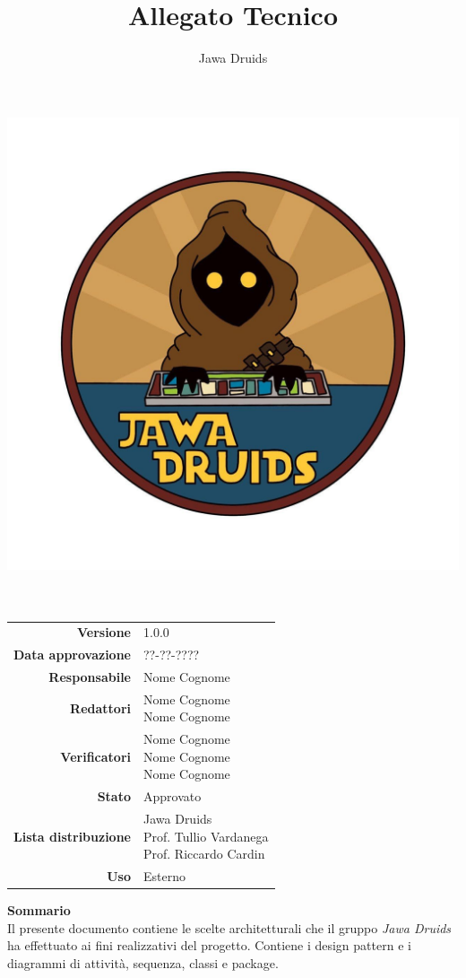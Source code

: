 \documentclass[a4paper,12pt]{report}
\begin{document}
	\makeatletter
	\begin{titlepage}
		\begin{center}
			\vspace*{-4,0cm}
			\author{Jawa Druids}
			\title{Allegato Tecnico}
			\date{}
			\includegraphics[width=0.5\linewidth]{../../immagini/DRUIDSLOGO.jpg}\\[4ex]

			
			{\huge \bfseries  \@title }\\[2ex] 
			{\LARGE  \@author}\\[50ex]
			\vspace*{-9,0cm}
			\begin{table}[H]
			\renewcommand{\arraystretch}{1.4}
			\centering
			\begin{tabular}{r | l}
				\textbf{Versione} & 1.0.0 \\%
				\textbf{Data approvazione} & ??-??-????\\
				\textbf{Responsabile} & Nome Cognome \\
				\textbf{Redattori} & \makecell[tl]{Nome Cognome \\ Nome Cognome} \\		
				\textbf{Verificatori} & \makecell[tl]{Nome Cognome \\ Nome Cognome \\Nome Cognome} \\
				\textbf{Stato} & Approvato\\
				\textbf{Lista distribuzione} & \makecell[tl]{Jawa Druids \\ Prof. Tullio Vardanega \\ Prof. Riccardo Cardin}\\
				\textbf{Uso} & Esterno     
			\end{tabular}
		\end{table}
		\vspace{0.1cm}
		\hfill \break
		\fontsize{17}{10}\textbf{Sommario} \\
		\vspace{0.1cm}
		Il presente documento contiene le scelte architetturali che il gruppo \emph{\normalsize{\textit{Jawa Druids}}} ha effettuato ai fini realizzativi del progetto. Contiene i design pattern e i diagrammi di attività, sequenza, classi e package.
		\end{center}
	\end{titlepage}
	\makeatother
	
	
	\tableofcontents{}
	
	
	
	
\end{document}

